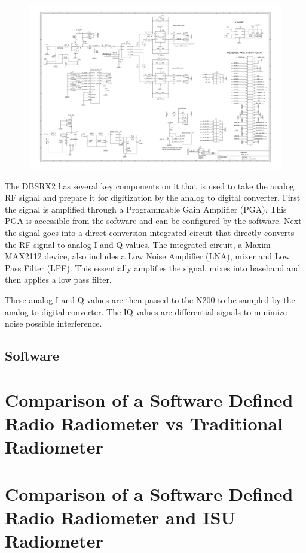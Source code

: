 {\begin{figure}[h!tb] 
\centering
\includegraphics{Images/dbsrx2}
\label{dbsrx2}
\end{figure}
}

The DBSRX2 has several key components on it that is used to take the analog RF signal and prepare it for digitization by the analog to digital converter.  First the signal is amplified through a Programmable Gain Amplifier (PGA).  This PGA is accessible from the software and can be configured by the software.  Next the signal goes into a direct-conversion integrated circuit that directly converts the RF signal to analog I and Q values.  The integrated circuit, a Maxim MAX2112 device, also includes a Low Noise Amplifier (LNA), mixer and Low Pass Filter (LPF).  This essentially amplifies the signal, mixes into baseband and then applies a low pass filter.  

These analog I and Q values are then passed to the N200 to be sampled by the analog to digital converter.  The IQ values are differential signals to minimize noise possible interference.

\subsection{Software}

\section{Comparison of a Software Defined Radio Radiometer vs Traditional Radiometer}

\section{Comparison of a Software Defined Radio Radiometer and ISU Radiometer}